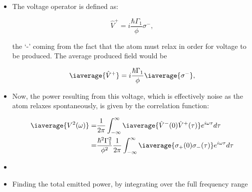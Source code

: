  \begin{itemize}
 	\item The voltage operator is defined as:
 	
 	\begin{equation}\label{feb22018}
 		\hat{V}^{+} = i\frac{\hbar\Gamma_1}{\phi}\sigma^{-},
 	\end{equation}
 	
 	\noindent the `-' coming from the fact that the atom must relax in order for voltage to be produced. The average produced field would be
 	
 	\[
 		\iaverage{\hat{V}^{+}} = i\frac{\hbar\Gamma_1}{\phi}\iaverage{\sigma^{-}},
 	\]
 	
 	\item Now, the power resulting from this voltage, which is effectively noise as the atom relaxes spontaneously, is given by the correlation function:
 	
 	\begin{equation}\label{feb22018:1}
 		\begin{aligned}
 			\iaverage{V^2(\omega)} = & \frac{1}{2\pi}\int_{-\infty}^{\infty}\iaverage{\hat{V}^{-}(0)\hat{V}^{+}(\tau)}e^{i\omega \tau}d\tau\\
 			= & \frac{\hbar^2\Gamma_1^{2}}{\phi^2}\frac{1}{2\pi}\int_{-\infty}^{\infty}\iaverage{\sigma_{+}(0)\sigma_{-}(\tau)}e^{i\omega \tau}d\tau
 		\end{aligned}
 	\end{equation}
 	
 	\item {} 
 
 	\item Finding the total emitted power, by integrating over the full frequency range 
 	

\end{itemize}
